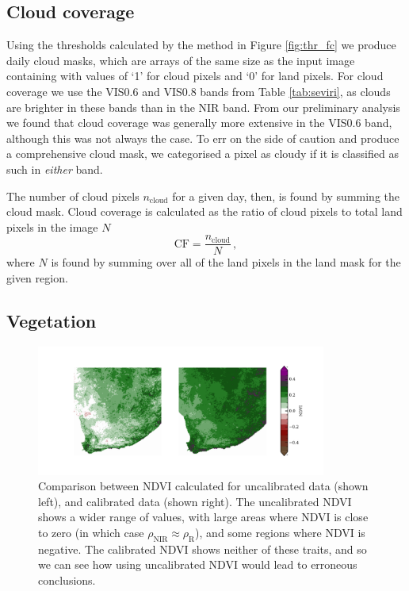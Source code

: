 \subsection{Cloud coverage}
Using the thresholds calculated by the method in Figure \ref{fig:thr_fc} we
produce daily cloud masks, which are arrays of the same size as the input image
containing with values of `1' for cloud pixels and `0' for land pixels. For
cloud coverage we use the VIS0.6 and VIS0.8 bands from Table \ref{tab:seviri},
as clouds are brighter in these bands than in the NIR band. From our preliminary
analysis we found that cloud coverage was generally more extensive in the VIS0.6
band, although this was not always the case. To err on the side of caution and
produce a comprehensive cloud mask, we categorised a pixel as cloudy if it is
classified as such in \emph{either} band.

The number of cloud pixels $n_{\mathrm{cloud}}$ for a given day, then, is found
by summing the cloud mask. Cloud coverage is calculated as the ratio of cloud
pixels to total land pixels in the image $N$
\begin{equation}
  \mathrm{CF} = \frac{n_{\mathrm{cloud}}}{N} \,,
  \label{eq:cloud_frac}
\end{equation}
where $N$ is found by summing over all of the land pixels in the land mask for
the given region.

\subsection{Vegetation}

\begin{figure}
  \centering
  \includegraphics[width=0.85\textwidth]{figures/ndvi_calibration_comparison.pdf}
  \caption{Comparison between NDVI calculated for uncalibrated data (shown left),
    and calibrated data (shown right). The uncalibrated NDVI shows a wider range
    of values, with large areas where NDVI is close to zero (in which case
    $\rho_{\textrm{NIR}}\approx\rho_{\textrm{R}}$), and some regions where NDVI is
    negative. The calibrated NDVI shows neither of these traits, and so we can
    see how using uncalibrated NDVI would lead to erroneous conclusions.}
  \label{fig:calibrationcomp}
\end{figure}

